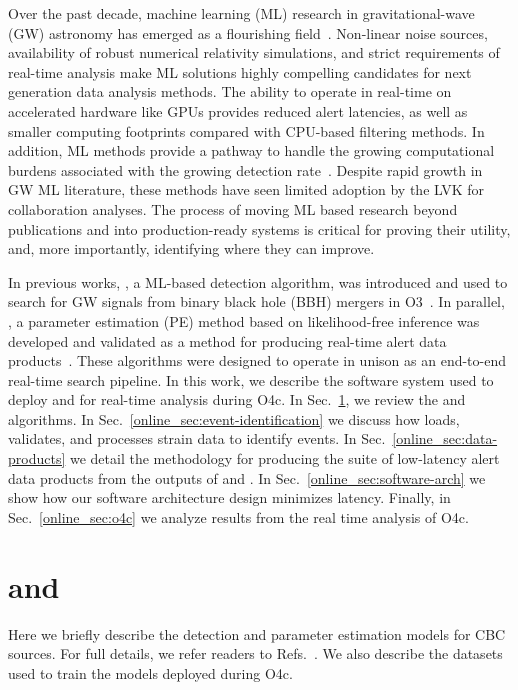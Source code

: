 \begin{refsection}
Over the past decade, machine learning (ML) research in gravitational-wave (GW) astronomy has emerged as a flourishing  field~\cite{Cuoco_2020}. 
Non-linear noise sources, availability of robust numerical relativity simulations, and strict requirements of real-time analysis make ML solutions highly compelling candidates for next generation data analysis methods. 
The ability to operate in real-time on accelerated hardware like GPUs provides reduced alert latencies, as well as smaller computing footprints compared with CPU-based filtering methods. 
In addition, ML methods provide a pathway to handle the growing computational burdens associated with the growing detection rate~\cite{gwtc-4}. 
Despite rapid growth in GW ML literature, these methods have seen limited adoption by the LVK for collaboration analyses. 
The process of moving ML based research beyond publications and into production-ready systems is critical for proving their utility, and, more importantly, identifying where they can improve. 

In previous works, \aframe, a ML-based detection algorithm, was introduced and used to search for GW signals from binary black hole (BBH) mergers in O3~\cite{aframe-methods, marx2025machine}. 
In parallel, \amplfi, a parameter estimation (PE) method based on likelihood-free inference was developed and validated as a method for producing real-time alert data products~\cite{amplfi, Marx:2025ioo}. 
These algorithms were designed to operate in unison as an end-to-end real-time search pipeline. 
In this work, we describe the software system used to deploy \aframe and \amplfi for real-time analysis during O4c. 
In Sec.~\ref{online_sec:models}, we review the \aframe and \amplfi algorithms.
In Sec.~\ref{online_sec:event-identification} we discuss how \aframe loads, validates, and processes strain data to identify events. 
In Sec.~\ref{online_sec:data-products} we detail the methodology for producing the suite of low-latency alert data products from the outputs of \aframe and \amplfi. 
In Sec.~\ref{online_sec:software-arch} we show how our software architecture design minimizes latency. 
Finally, in Sec.~\ref{online_sec:o4c} we analyze results from the real time analysis of O4c.


\section{\aframe and \amplfi}  \label{online_sec:models}
Here we briefly describe the \aframe detection and \amplfi parameter estimation models for CBC sources. 
For full details, we refer readers to Refs.~\cite{aframe-methods, Marx:2025ioo}. 
We also describe the datasets used to train the models deployed during O4c. 


\end{refsection}
